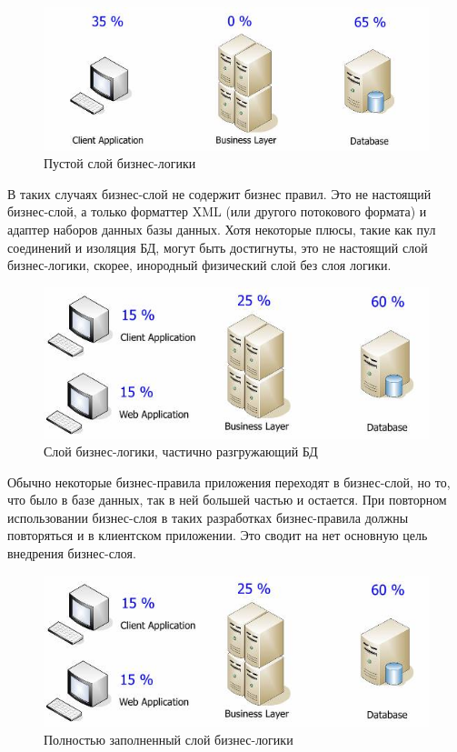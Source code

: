 \documentclass[14pt, a4paper]{extreport}
\begin{document}
\begin{figure}[!htb]
  \centering
    \includegraphics[scale=0.6]{../shared_images/business-logic/client-server-business.jpg}
   \caption{Пустой слой бизнес-логики}
    \label{fig:start}
\end{figure}

В таких случаях бизнес-слой не содержит бизнес правил. Это не настоящий бизнес-слой, а только форматтер XML (или другого потокового формата) и адаптер наборов данных базы данных. Хотя некоторые плюсы, такие как пул соединений и изоляция БД, могут быть достигнуты, это не настоящий слой бизнес-логики, скорее, инородный физический слой без слоя логики.

\begin{figure}[!htb]
  \centering
    \includegraphics[scale=0.6]{../shared_images/business-logic/client-server-business-2.jpg}
   \caption{Слой бизнес-логики, частично разгружающий БД}
    \label{fig:start}
\end{figure}

Обычно некоторые бизнес-правила приложения переходят в бизнес-слой, но то, что было в базе данных, так в ней большей частью и остается. При повторном использовании бизнес-слоя в таких разработках бизнес-правила должны повторяться и в клиентском приложении. Это сводит на нет основную цель внедрения бизнес-слоя.

\begin{figure}[!htb]
  \centering
    \includegraphics[scale=0.6]{../shared_images/business-logic/client-server-business-2.jpg}
   \caption{Полностью заполненный слой бизнес-логики}
    \label{fig:start}
\end{figure}
\end{document}
